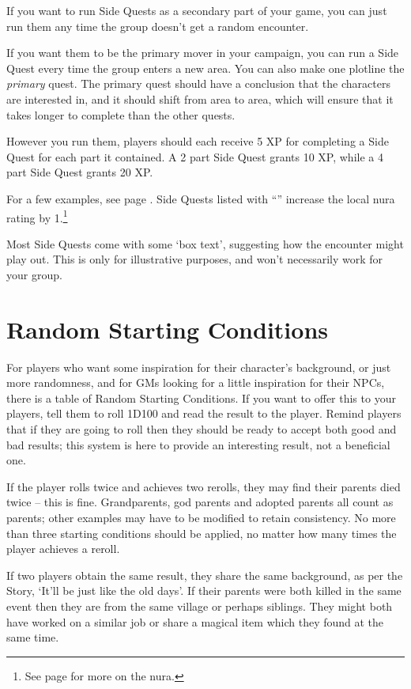 If you want to run Side Quests as a secondary part of your game, you can just run them any time the group doesn't get a random encounter.

If you want them to be the primary mover in your campaign, you can run a Side Quest every time the group enters a new area.  You can also make one plotline the \emph{primary} quest.  The primary quest should have a conclusion that the characters are interested in, and it should shift from area to area, which will ensure that it takes longer to complete than the other quests.

However you run them, players should each receive 5 XP for completing a Side Quest for each part it contained.  A 2 part Side Quest grants 10 XP, while a 4 part Side Quest grants 20 XP.

For a few examples, see page \pageref{forest_encounters}.  Side Quests listed with ``'' increase the local nura rating by 1.\footnote{See page \pageref{nura} for more on the nura.}

Most Side Quests come with some `box text', suggesting how the encounter might play out.  This is only for illustrative purposes, and won't necessarily work for your group.

\section{Random Starting Conditions}

For players who want some inspiration for their character's background, or just more randomness, and for GMs looking for a little inspiration for their NPCs, there is a table of Random Starting Conditions.  If you want to offer this to your players, tell them to roll 1D100 and read the result to the player.  Remind players that if they are going to roll then they should be ready to accept both good and bad results; this system is here to provide an interesting result, not a beneficial one.

If the player rolls twice and achieves two rerolls, they may find their parents died twice -- this is fine.  Grandparents, god parents and adopted parents all count as parents; other examples may have to be modified to retain consistency.  No more than three starting conditions should be applied, no matter how many times the player achieves a reroll.

	If two players obtain the same result, they share the same background, as per the Story, `It'll be just like the old days'.  If their parents were both killed in the same event then they are from the same village or perhaps siblings.  They might both have worked on a similar job or share a magical item which they found at the same time.

